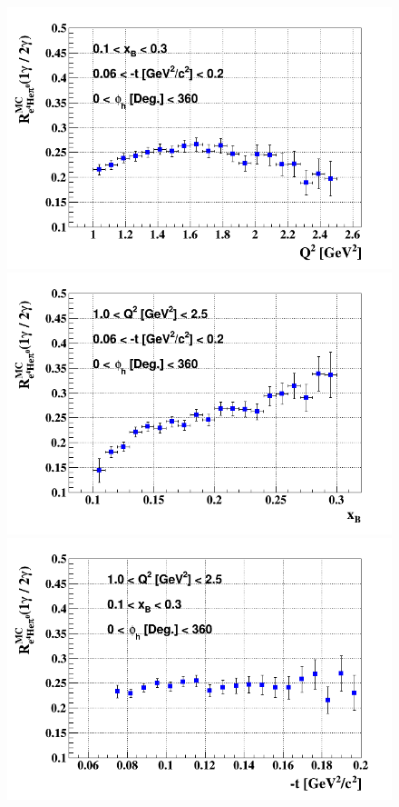 \begin{figure}[tp]
\centering
\includegraphics[scale=0.30]{fig_dvcs/e4Hegamma_e4Hepi0_Q2.png}
\includegraphics[scale=0.30]{fig_dvcs/e4Hegamma_e4Hepi0_xB.png}
\includegraphics[scale=0.30]{fig_dvcs/e4Hegamma_e4Hepi0_t.png}

\end{figure}
